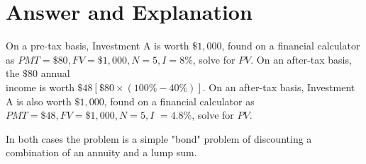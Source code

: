 \documentclass[11pt]{article}
\begin{document}
\section*{Answer and Explanation}
On a pre-tax basis, Investment A is worth $\$ 1,000$, found on a financial calculator as $P M T=\$ 80, F V=\$ 1,000, N=5, I=8 \%$, solve for $P V$. On an after-tax basis, the $\$ 80$ annual\\
income is worth $\$ 48[\$ 80 \times(100 \%-40 \%)]$. On an after-tax basis, Investment A is also worth $\$ 1,000$, found on a financial calculator as $P M T=\$ 48, F V=\$ 1,000, N=5, I$ $=4.8 \%$, solve for $P V$.

In both cases the problem is a simple "bond" problem of discounting a combination of an annuity and a lump sum.
\end{document}
